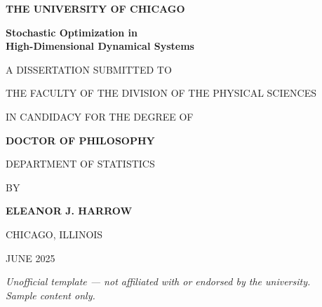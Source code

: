\documentclass[12pt,letterpaper,twoside]{report}
\begin{document}
\begin{titlepage}
\thispagestyle{empty}
\begin{center}

\vspace*{1.5cm}

{\LARGE\bfseries\color{ChicagoMaroon} THE UNIVERSITY OF CHICAGO}

\vspace{0.6cm}

\titlerulemaroon{0.8pt}

\vspace{2cm}

{\Huge\bfseries\color{ChicagoDark} Stochastic Optimization in\\ High-Dimensional Dynamical Systems}

\vspace{1.8cm}

{\Large\color{ChicagoGray} A DISSERTATION SUBMITTED TO}

\vspace{0.4cm}

{\Large\color{ChicagoGray} THE FACULTY OF THE DIVISION OF THE PHYSICAL SCIENCES}

\vspace{0.4cm}

{\Large\color{ChicagoGray} IN CANDIDACY FOR THE DEGREE OF}

\vspace{0.4cm}

{\Large\bfseries\color{ChicagoDark} DOCTOR OF PHILOSOPHY}

\vspace{1cm}

{\Large\color{ChicagoGray} DEPARTMENT OF STATISTICS}

\vspace{1.4cm}

{\Large\color{ChicagoDark} BY}

\vspace{0.4cm}

{\LARGE\bfseries\color{ChicagoMaroon} ELEANOR J. HARROW}

\vspace{1.8cm}

\titlerulemaroon{0.5pt}

\vspace{1.2cm}

{\large\color{ChicagoGray} CHICAGO, ILLINOIS}

\vspace{0.3cm}

{\large\color{ChicagoGray} JUNE 2025}

\vspace{2cm}

{\footnotesize\color{ChicagoGray!70}\itshape
Unofficial template --- not affiliated with or endorsed by the university.\\
Sample content only.}

\end{center}
\end{titlepage}
\end{document}
